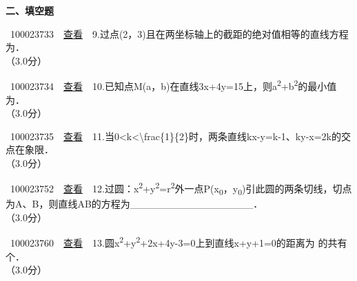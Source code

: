 \documentclass[]{article}
\begin{document}
\textbf{二、填空题}

~{{100023733}~~\href{../question/viewQuestionDetail.jsp?questionID=100023733\&testPaperId=100229072}{查看}~~9.过点(2，3)且在两坐标轴上的截距的绝对值相等的直线方程为．\\
\hspace*{0.333em}\hspace*{0.333em}（3.0分）\\
}

~{{100023734}~~\href{../question/viewQuestionDetail.jsp?questionID=100023734\&testPaperId=100229072}{查看}~~10.已知点M(a，b)在直线3x+4y=15上，则a\textsuperscript{2}+b\textsuperscript{2}的最小值为．\\
\hspace*{0.333em}\hspace*{0.333em}（3.0分）\\
}

~{{100023735}~~\href{../question/viewQuestionDetail.jsp?questionID=100023735\&testPaperId=100229072}{查看}~~11.当0\textless{}k\textless{}{\textbackslash{}frac\{1\}\{2\}}时，两条直线kx-y=k-1、ky-x=2k的交点在象限．\\
\hspace*{0.333em}\hspace*{0.333em}（3.0分）\\
}

~{{100023752}~~\href{../question/viewQuestionDetail.jsp?questionID=100023752\&testPaperId=100229072}{查看}~~12.过圆：x\textsuperscript{2}+y\textsuperscript{2}=r\textsuperscript{2}外一点P(x\textsubscript{0}，y\textsubscript{0})引此圆的两条切线，切点为A、B，则直线AB的方程为\_\_\_\_\_\_\_\_\_\_\_\_\_\_\_\_\_．\\
\hspace*{0.333em}\hspace*{0.333em}（3.0分）\\
}

~{{100023760}~~\href{../question/viewQuestionDetail.jsp?questionID=100023760\&testPaperId=100229072}{查看}~~13.圆x\textsuperscript{2}+y\textsuperscript{2}+2x+4y-3=0上到直线x+y+1=0的距离为
的共有个．\\
\hspace*{0.333em}\hspace*{0.333em}（3.0分）\\
}

~

~

~

~

~
\end{document}
